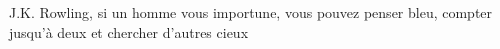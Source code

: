 J.K. Rowling, si un homme vous importune, vous pouvez penser bleu, compter jusqu'à deux et chercher d'autres cieux

